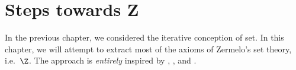 \documentclass[../../../include/open-logic-chapter]{subfiles}
\begin{document}
\chapter{Steps towards Z}\label{ch:z}
In the previous chapter, we considered the iterative conception of set. In this chapter, we will attempt to extract most of the axioms of Zermelo's set theory, i.e.\ $\Z$. The approach is \emph{entirely} inspired by \citet{Boolos1971},  \citet{Scott1974}, and \citet{Shoenfield:AST}. %


\OLEndChapterHook
\end{document}
